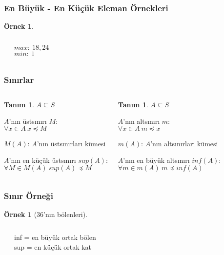 \documentclass[dvipsnames]{beamer}
\theoremstyle{definition}
\newtheorem{tanim}[theorem]{Tanım}
\theoremstyle{example}
\newtheorem{ornek}[theorem]{Örnek}
\theoremstyle{plain}
\begin{document}
\begin{frame}
  \frametitle{En Büyük - En Küçük Eleman Örnekleri}

  \begin{ornek}
    \begin{columns}
      \begin{center}
      \end{center}

      $max:~18,24$\\
      $min:~1$
    \end{columns}
  \end{ornek}
\end{frame}

\begin{frame}
  \frametitle{Sınırlar}

  \begin{columns}[t]
    \begin{tanim}
      $A \subseteq S$

      \medskip
      $A$'nın \alert{üstsınırı} $M$:\\
      $\forall x \in A~x \preceq M$

      \bigskip
      $M(A)$: $A$'nın üstsınırları kümesi

      \medskip
      $A$'nın \alert{en küçük üstsınırı} $sup(A)$:\\
      $\forall M \in M(A)~sup(A) \preceq M$
    \end{tanim}

    \pause
    \begin{tanim}
      $A \subseteq S$

      \medskip
      $A$'nın \alert{altsınırı} $m$:\\
      $\forall x \in A~m \preceq x$

      \bigskip
      $m(A)$: $A$'nın altsınırları kümesi

      \medskip
      $A$'nın \alert{en büyük altsınırı} $inf(A)$:\\
      $\forall m \in m(A)~m \preceq inf(A)$
    \end{tanim}
  \end{columns}
\end{frame}

\begin{frame}
  \frametitle{Sınır Örneği}

  \begin{ornek}[36'nın bölenleri]
    \begin{columns}
      \begin{center}
      \end{center}

      inf = en büyük ortak bölen\\
      sup = en küçük ortak kat
    \end{columns}
  \end{ornek}
\end{frame}
\end{document}
